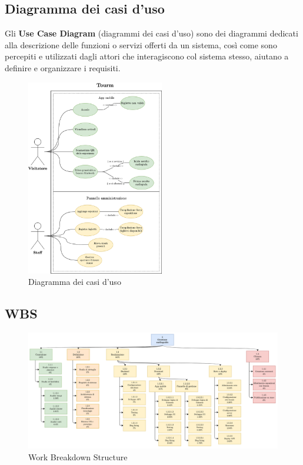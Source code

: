 \documentclass[12pt]{article}
\begin{document}
\clearpage

\subsection{Diagramma dei casi d'uso}
Gli \textbf{Use Case Diagram} (diagrammi dei casi d'uso) sono dei diagrammi dedicati alla descrizione delle funzioni o servizi offerti da un sistema, così come sono percepiti e utilizzati dagli attori che interagiscono col sistema stesso, aiutano a definire e organizzare i requisiti. \cite{use_case}
\begin{center}
    \begin{figure}[htp]
        \centering
        \includegraphics[width=6cm]{diagrams/usecase_diagrams_V2.png}
        \caption{Diagramma dei casi d'uso}
        \label{fig:usecase}
    \end{figure}
\end{center}

\subsection{WBS}
\begin{center}
    \begin{figure}[htp]
        \centering
        \includegraphics[width=14cm]{diagrams/elaborato_wbs_v2-wbs_V2_rev.png}
        \caption{Work Breakdown Structure}
        \label{fig:wbs}
    \end{figure}
\end{center}
\clearpage
\end{document}
